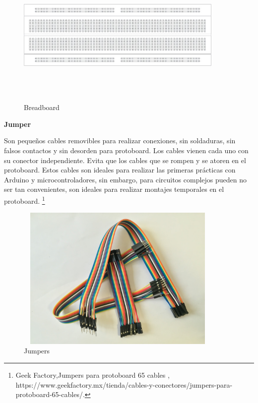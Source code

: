 \documentclass[12pt]{report}%
\begin{document}
 \begin{figure}[H]
\centering
	 \includegraphics[width=10cm, height=7cm]{breadboard-01.jpg}
	 \caption[Breadboard]{Breadboard  }%
	 	 \label{fig:Breadboard}
\end{figure}
 
 \textbf{Jumper}
 
Son pequeños cables removibles para realizar conexiones, sin soldaduras, sin falsos contactos y sin desorden para protoboard. Los cables vienen cada uno con su conector independiente. Evita que los cables que se rompen y se atoren en el protoboard.
Estos cables son ideales para realizar las primeras prácticas con Arduino y microcontroladores, sin embargo, para circuitos complejos pueden no ser tan convenientes, son ideales para realizar montajes temporales en el protoboard. \footnote{Geek Factory,Jumpers para protoboard 65 cables , https://www.geekfactory.mx/tienda/cables-y-conectores/jumpers-para-protoboard-65-cables/.}   
\newpage
 \begin{figure}[H]
\centering
	 \includegraphics[width=10cm, height=7cm]{Jumpers.JPG}
	 \caption[Jumpers]{Jumpers}%
	 	 \label{fig:Jumpers}
\end{figure}
\end{document}
